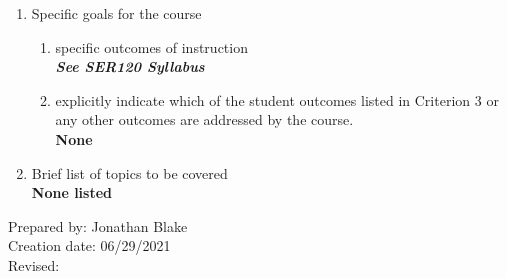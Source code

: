 \begin{enumerate}[1.]
\begin{enumerate}[a.]
\end{enumerate}

\item Specific goals for the course
\begin{enumerate}
\item specific outcomes of instruction\\ %
  {\bfseries
    \emph{See SER120 Syllabus}
  }

\item explicitly indicate which of the student outcomes listed in Criterion 3 or any other outcomes are addressed by the course.\\
  {\bfseries
    None
  }
\end{enumerate}

\item Brief list of topics to be covered\\
  {\bfseries
  None listed
  }

\end{enumerate}

\noindent Prepared by: Jonathan Blake\\
\noindent Creation date: 06/29/2021\\
\noindent Revised:\\
